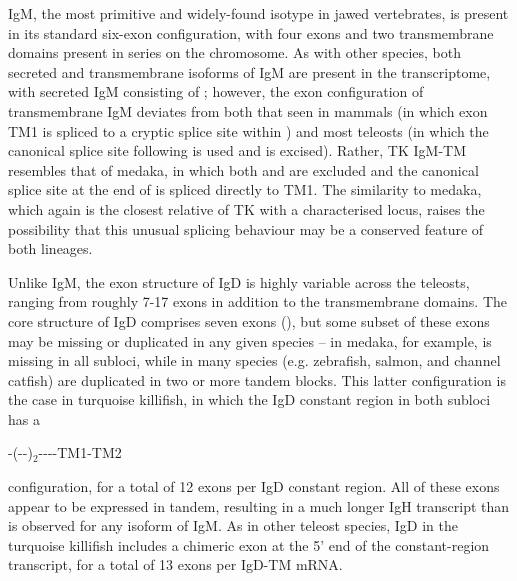	IgM, the most primitive and widely-found isotype in jawed vertebrates, is present in its standard six-exon configuration, with four \cm{} exons and two transmembrane domains present in series on the chromosome. As with other species, both secreted and transmembrane isoforms of IgM are present in the transcriptome, with secreted IgM consisting of ; however, the exon configuration of transmembrane IgM deviates from both that seen in mammals (in which exon TM1 is spliced to a cryptic splice site within ) and most teleosts (in which the canonical splice site following  is used and  is excised). Rather, TK IgM-TM resembles that of medaka, in which both  and  are excluded and the canonical splice site at the end of  is spliced directly to TM1. The similarity to medaka, which again is the closest relative of TK with a characterised locus, raises the possibility that this unusual splicing behaviour may be a conserved feature of both lineages.
	
	
	Unlike IgM, the exon structure of IgD is highly variable across the teleosts, ranging from roughly 7-17 \cd{} exons in addition to the transmembrane domains. The core structure of IgD comprises seven \cd{} exons (), but some subset of these exons may be missing or duplicated in any given species -- in medaka, for example,  is missing in all subloci, while in many species (e.g. zebrafish, salmon, and channel catfish)  are duplicated in two or more tandem blocks. This latter configuration is the case in turquoise killifish, in which the IgD constant region in both subloci has a 

-(--)$_2$----TM1-TM2 

	\noindent configuration, for a total of 12 exons per IgD constant region. All of these exons appear to be expressed in tandem, resulting in a much longer IgH transcript than is observed for any isoform of IgM. %
As in other teleost species, IgD in the turquoise killifish includes a chimeric  exon at the 5' end of the constant-region transcript, for a total of 13 exons per IgD-TM mRNA. %

